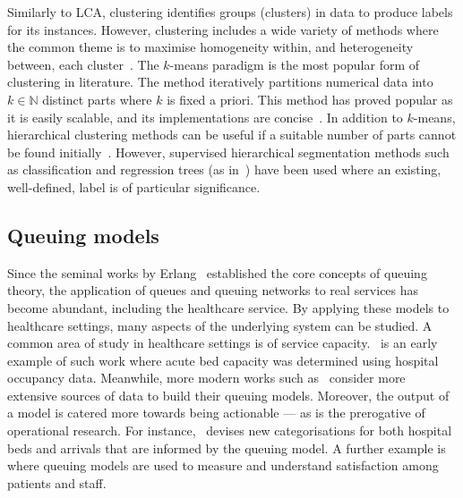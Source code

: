 Similarly to LCA, clustering identifies groups (clusters) in data to produce
labels for its instances. However, clustering includes a wide variety of methods
where the common theme is to maximise homogeneity within, and heterogeneity
between, each cluster~\cite{Everitt2011}. The \(k\)-means paradigm is the most
popular form of clustering in literature. The method iteratively partitions
numerical data into \(k \in \mathbb N\) distinct parts where \(k\) is fixed a
priori. This method has proved popular as it is easily scalable, and its
implementations are concise~\cite{Olafsson2008,Wu2009}. In addition to
\(k\)-means, hierarchical clustering methods can be useful if a suitable number
of parts cannot be found initially~\cite{Vuik2016a}. However, supervised
hierarchical segmentation methods such as classification and regression trees
(as in~\cite{Harper2006}) have been used where an existing, well-defined, label
is of particular significance.

\subsection{Queuing models}

Since the seminal works by Erlang~\cite{Erlang1917,Erlang1920} established the
core concepts of queuing theory, the application of queues and queuing networks
to real services has become abundant, including the healthcare service. By
applying these models to healthcare settings, many aspects of the underlying
system can be studied. A common area of study in healthcare settings is of
service capacity.~\cite{McClain1976} is an early example of such work where
acute bed capacity was determined using hospital occupancy data. Meanwhile, more
modern works such as~\cite{Palvannan2012,Pinto2014} consider more extensive
sources of data to build their queuing models.  Moreover, the output of a model
is catered more towards being actionable --- as is the prerogative of
operational research. For instance,~\cite{Pinto2014} devises new categorisations
for both hospital beds and arrivals that are informed by the queuing model. A
further example is~\cite{Komashie2015} where queuing models are used to measure
and understand satisfaction among patients and staff.

